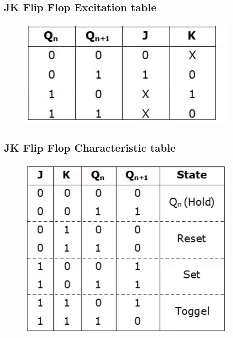 \documentclass[11pt]{article}
\begin{document}
\subsection{JK Flip Flop Excitation table}
\begin{figure}[H]
	\centering
	\includegraphics[scale = 0.5]{jk flip flop excitation table.png}
\end{figure}
\subsection{JK Flip Flop Characteristic table}
\begin{figure}[H]
	\centering
	\includegraphics[scale = 0.5]{jk flip flop characteristic table.png}
\end{figure}
\end{document}
